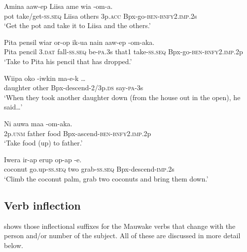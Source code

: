 \ea%
\label{ex:3:x221}
\gll Amina aaw-ep Liisa ame wia -om-a.\\
pot take/get-\textsc{ss}.\textsc{seq} Liisa others 3p.\textsc{acc} Bpx-go-\textsc{ben}-\textsc{bnfy}2.\textsc{imp}.2s\\
\glt`Get the pot and take it to Liisa and the others.' 
\z

\ea%
\label{ex:3:x430}
\gll Pita pensil wiar or-op ik-ua nain aaw-ep -om-aka.\\
Pita pencil 3.\textsc{dat} fall-\textsc{ss}.\textsc{seq} be-\textsc{pa}.3s that1 take-\textsc{ss}.\textsc{seq} Bpx-go-\textsc{ben}-\textsc{bnfy}2.\textsc{imp}.2p\\
\glt`Take to Pita his pencil that has dropped.'
\z

\ea%
\label{ex:3:x222}
\gll Wiipa oko -iwkin ma-e-k {\dots} \\
daughter other Bpx-descend-2/3p.\textsc{ds} say-\textsc{pa}-3s \\
\glt`When they took another daughter down (from the house out in the open), he said{\dots}' 
\z

\ea%
\label{ex:3:x223}
\gll Ni auwa maa -om-aka. \\
2p.\textsc{unm} father food Bpx-ascend-\textsc{ben}-\textsc{bnfy}2.\textsc{imp}.2p \\
\glt`Take food (up) to father.'
\z

\ea%
\label{ex:3:x224}
\gll Iwera ir-ap erup op-ap -e. \\
coconut go.up-\textsc{ss}.\textsc{seq} two grab-\textsc{ss}.\textsc{seq} Bpx-descend-\textsc{imp}.2s \\
\glt`Climb the coconut palm, grab two coconuts and bring them down.' 
\z

\subsection{Verb inflection} \label{sec:3:y:x}
{}
 shows those inflectional suffixes for the Mauwake verbs that change with the person and/or number of the subject. All of these are discussed in more detail below.

